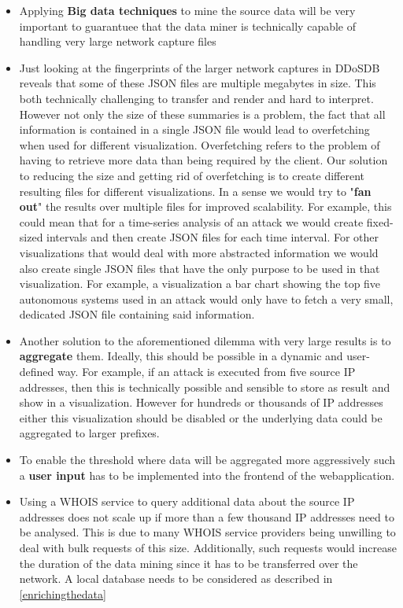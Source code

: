     \begin{itemize}
    \item     Applying \textbf{Big data techniques} to mine the source data will be very important to guarantuee that the data miner is technically capable of handling very large network capture files
\item Just looking at the fingerprints of the larger network captures in DDoSDB reveals that some of these JSON files are multiple megabytes in size. This both technically challenging to transfer and render and hard to interpret. However not only the size of these summaries is a problem, the fact that all information is contained in a single JSON file would lead to overfetching when used for different visualization. Overfetching refers to the problem of having to retrieve more data than being required by the client. Our solution to reducing the size and getting rid of overfetching is to create different resulting files for different visualizations. In a sense we would try to "\textbf{fan out}" the results over multiple files for improved scalability. For example, this could mean that for a time-series analysis of an attack we would create fixed-sized intervals and then create JSON files for each time interval. For other visualizations that would deal with more abstracted information we would also create single JSON files that have the only purpose to be used in that visualization. For example, a visualization a bar chart showing the top five autonomous systems used in an attack would only have to fetch a very small, dedicated JSON file containing said information.
\item Another solution to the aforementioned dilemma with very large results is to \textbf{aggregate} them. Ideally, this should be possible in a dynamic and user-defined way. For example, if an attack is executed from five source IP addresses, then this is technically possible and sensible to store as result and show in a visualization. However for hundreds or thousands of IP addresses either this visualization should be disabled or the underlying data could be aggregated to larger prefixes.
\item To enable the threshold where data will be aggregated more aggressively such a \textbf{user input} has to be implemented into the frontend of the webapplication.
\item Using a WHOIS service to query additional data about the source IP addresses does not scale up if more than a few thousand IP addresses need to be analysed. This is due to many WHOIS service providers being unwilling to deal with bulk requests of this size. Additionally, such requests would increase the duration of the data mining since it has to be transferred over the network. A local database needs to be considered as described in \ref{enrichingthedata}
\end{itemize}
    
